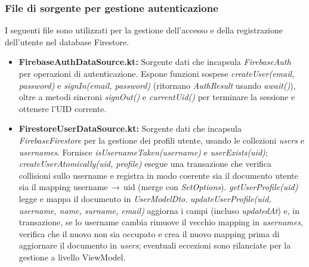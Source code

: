 \documentclass{article}
\begin{document}
\subsubsection{File di sorgente per gestione autenticazione}
I seguenti file sono utilizzati per la gestione dell'accesso e della registrazione dell'utente nel database Firestore.
\begin{itemize}
  \item \textbf{FirebaseAuthDataSource.kt:} Sorgente dati che incapsula \textit{FirebaseAuth} per operazioni di autenticazione. 
  Espone funzioni sospese \textit{createUser(email, password)} e \textit{signIn(email, password)} (ritornano \textit{AuthResult} usando \textit{await()}), oltre a metodi sincroni \textit{signOut()} e \textit{currentUid()} per terminare la sessione e ottenere l’UID corrente.

  \item \textbf{FirestoreUserDataSource.kt:} Sorgente dati che incapsula \textit{FirebaseFirestore} per la gestione dei profili utente, usando le collezioni \textit{users} e \textit{usernames}. 
  Fornisce \textit{isUsernameTaken(username)} e \textit{userExists(uid)}; \textit{createUserAtomically(uid, profile)} esegue una transazione che verifica collisioni sullo username e registra in modo coerente sia il documento utente sia il mapping username\,$\rightarrow$\,uid (merge con \textit{SetOptions}). \textit{getUserProfile(uid)} legge e mappa il documento in \textit{UserModelDto}. \textit{updateUserProfile(uid, username, name, surname, email)} aggiorna i campi (incluso \textit{updatedAt}) e, in transazione, se lo username cambia rimuove il vecchio mapping in \textit{usernames}, verifica che il nuovo non sia occupato e crea il nuovo mapping prima di aggiornare il documento in \textit{users}; eventuali eccezioni sono rilanciate per la gestione a livello ViewModel.

\end{itemize}
\end{document}

